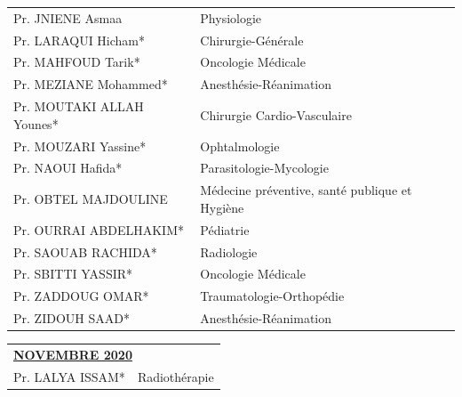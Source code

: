 \begin{table}[H]
\begin{tabular}{l l}
    Pr. JNIENE Asmaa & Physiologie \\
    Pr. LARAQUI Hicham* & Chirurgie-Générale \\
    Pr. MAHFOUD Tarik* & Oncologie Médicale \\
    Pr. MEZIANE Mohammed* & Anesthésie-Réanimation \\
    Pr. MOUTAKI ALLAH Younes* & Chirurgie Cardio-Vasculaire \\
    Pr. MOUZARI Yassine* & Ophtalmologie \\
    Pr. NAOUI Hafida* & Parasitologie-Mycologie \\
    Pr. OBTEL MAJDOULINE & Médecine préventive, santé publique et Hygiène \\
    Pr. OURRAI ABDELHAKIM* & Pédiatrie \\
    Pr. SAOUAB RACHIDA* & Radiologie \\
    Pr. SBITTI YASSIR* & Oncologie Médicale \\
    Pr. ZADDOUG OMAR* & Traumatologie-Orthopédie \\
    Pr. ZIDOUH SAAD* & Anesthésie-Réanimation \\
  \end{tabular}
\end{table}


\begin{table}[H]
  \begin{tabular}{l l}
    \multicolumn{2}{l}{\textbf{\underline{NOVEMBRE 2020}}}\vspace*{0.5em}\\
    Pr. LALYA ISSAM* & Radiothérapie \\
  \end{tabular}
\end{table}

